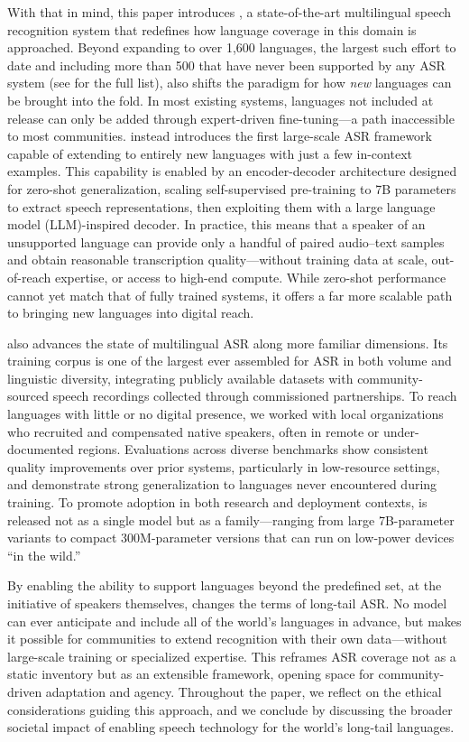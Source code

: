 \documentclass[]{fairmeta}
\begin{document}
With that in mind, this paper introduces \textbf{\OmniASR}, a state-of-the-art multilingual speech recognition system that redefines how language coverage in this domain is approached. Beyond expanding to over 1,600 languages, the largest such effort to date and including more than 500 that have never been supported by any ASR system (see  for the full list), \OmniASR also shifts the paradigm for how \textit{new} languages can be brought into the fold. In most existing systems, languages not included at release can only be added through expert-driven fine-tuning—a path inaccessible to most communities. \OmniASR instead introduces the first large-scale ASR framework capable of extending to entirely new languages with just a few in-context examples. This capability is enabled by an encoder-decoder architecture designed for zero-shot generalization, scaling self-supervised pre-training to 7B parameters to extract speech representations, then exploiting them with a large language model (LLM)-inspired decoder. In practice, this means that a speaker of an unsupported language can provide only a handful of paired audio–text samples and obtain reasonable transcription quality—without training data at scale, out-of-reach expertise, or access to high-end compute. While zero-shot performance cannot yet match that of fully trained systems, it offers a far more scalable path to bringing new languages into digital reach.

\OmniASR also advances the state of multilingual ASR along more familiar dimensions. Its training corpus is one of the largest ever assembled for ASR in both volume and linguistic diversity, integrating publicly available datasets with community-sourced speech recordings collected through commissioned partnerships. To reach languages with little or no digital presence, we worked with local organizations who recruited and compensated native speakers, often in remote or under-documented regions. Evaluations across diverse benchmarks show consistent quality improvements over prior systems, particularly in low-resource settings, and demonstrate strong generalization to languages never encountered during training. To promote adoption in both research and deployment contexts, \OmniASR is released not as a single model but as a family—ranging from large 7B-parameter variants to compact 300M-parameter versions that can run on low-power devices “in the wild.”

By enabling the ability to support languages beyond the predefined set, at the initiative of speakers themselves, \OmniASR changes the terms of long-tail ASR. No model can ever anticipate and include all of the world’s languages in advance, but \OmniASR makes it possible for communities to extend recognition with their own data—without large-scale training or specialized expertise. This reframes ASR coverage not as a static inventory but as an extensible framework, opening space for community-driven adaptation and agency. Throughout the paper, we reflect on the ethical considerations guiding this approach, and we conclude by discussing the broader societal impact of enabling speech technology for the world’s long-tail languages.
\end{document}
